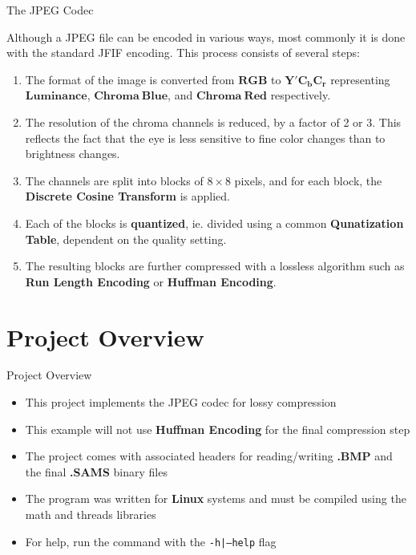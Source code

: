 \documentclass[10pt]{beamer}
\begin{document}
\begin{frame}{The JPEG Codec}

    Although a JPEG file can be encoded in various ways, most commonly it is done with the standard JFIF encoding. This process consists of several steps:
    \begin{enumerate}
     \item The format of the image is converted from $\bm{RGB}$ to  $\bm{Y'C_bC_r}$ representing $\bm{Luminance}$, $\bm{Chroma\ Blue}$, and $\bm{Chroma\ Red}$ respectively.
     \item The resolution of the chroma channels is reduced, by a factor of 2 or 3. This reflects the fact that the eye is less sensitive to fine color changes than to brightness changes.
     \item The channels are split into blocks of $8\times8$ pixels, and for each block, the \textbf{Discrete Cosine Transform} is applied.
     \item Each of the blocks is \textbf{quantized}, ie. divided using a common \textbf{Qunatization Table}, dependent on the quality setting.
     \item The resulting blocks are further compressed with a lossless algorithm such as \textbf{Run Length Encoding} or \textbf{Huffman Encoding}.
    \end{enumerate}

\end{frame}


\section{Project Overview}

\begin{frame}{Project Overview}
    \begin{itemize}
     \item This project implements the JPEG codec for lossy compression
     \item This example will not use \textbf{Huffman Encoding} for the final compression step
     \item The project comes with associated headers for reading/writing \textbf{.BMP} and the final \textbf{.SAMS} binary files
     \item The program was written for \textbf{Linux} systems and must be compiled using the math and threads libraries
     \item For help, run the command with the \texttt{-h|--help} flag
    \end{itemize}
\end{frame}
\end{document}
